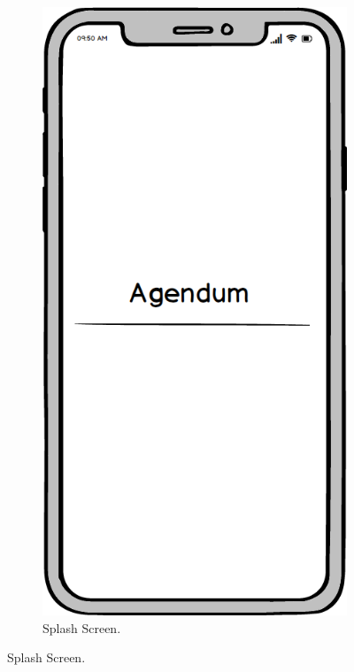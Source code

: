 \begin{figure}[H]
    \centering
    \begin{subfigure}[b]{0.3\textwidth}
        \centering
        \includegraphics[width=\textwidth]{./graphics/design/Start.png}
        \caption{Splash Screen.}

\end{subfigure}
\end{figure}
